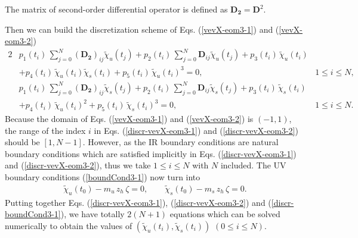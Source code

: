 \documentclass[11pt,a4paper,psfrag]{article}
\begin{document}
The matrix of second-order differential operator is defined as $\mathbf{D_{2}}=\mathbf{D}^{2}$.
\par
Then we can build the discretization scheme of Eqs. (\ref{vevX-eom3-1}) and (\ref{vevX-eom3-2})
\begin{alignat}{2}
&p_{1}(t_{i})\, \sum_{j=0}^{N}\left(\mathbf{D_{2}}\right)_{ij} \tilde{\chi}_{u}(t_{j})+p_{2}(t_{i})\, \sum_{j=0}^{N}\mathbf{D}_{i j} \tilde{\chi}_{u}(t_{j})+p_{3}(t_{i})\,\tilde{\chi}_{u}(t_{i}) \nonumber & \\
&+p_{4}(t_{i})\, \tilde{\chi}_{u}(t_{i})\tilde{\chi}_{s}(t_{i})+ p_{5}(t_{i})\, \tilde{\chi}_{u}(t_{i})^{3}=0, \quad &1 \le i \le N, \label{discr-vevX-eom3-1} &\\
&p_{1}(t_{i})\, \sum_{j=0}^{N}\left(\mathbf{D_{2}}\right)_{ij} \tilde{\chi}_{s}(t_{j})+p_{2}(t_{i})\, \sum_{j=0}^{N}\mathbf{D}_{i j} \tilde{\chi}_{s}(t_{j})+p_{3}(t_{i})\,\tilde{\chi}_{s}(t_{i}) \nonumber & \\
&+p_{4}(t_{i})\, \tilde{\chi}_{u}(t_{i})^{2}+ p_{5}(t_{i})\, \tilde{\chi}_{s}(t_{i})^{3}=0, \quad &1 \le i \le N.  \label{discr-vevX-eom3-2} &
\end{alignat}
Because the domain of Eqs. (\ref{vevX-eom3-1}) and (\ref{vevX-eom3-2}) is $\left(-1,1\right)$, the range of the index $i$ in Eqs. (\ref{discr-vevX-eom3-1}) and (\ref{discr-vevX-eom3-2}) should be $\left[1,N-1\right]$. However, as the IR boundary conditions are natural boundary conditions which are satisfied implicitly in Eqs. (\ref{discr-vevX-eom3-1}) and (\ref{discr-vevX-eom3-2}), thus we take $1\le i\le N$ with $N$ included. The UV boundary conditions (\ref{boundCond3-1}) now turn into
\begin{align}\label{discr-boundCond3-1}
\tilde{\chi}_{u}(t_{0})-m_u\,z_h\,\zeta=0,  \qquad  \tilde{\chi}_{s}(t_{0})-m_s\,z_h\,\zeta=0.
\end{align}
Putting together Eqs. (\ref{discr-vevX-eom3-1}), (\ref{discr-vevX-eom3-2}) and (\ref{discr-boundCond3-1}), we have totally $2\left( N+1 \right)$ equations which can be solved numerically to obtain the values of $\left(\tilde{\chi}_{u}(t_i), \tilde{\chi}_{s}(t_i)\right)$ $(0\le i \le N)$.





\end{document}
